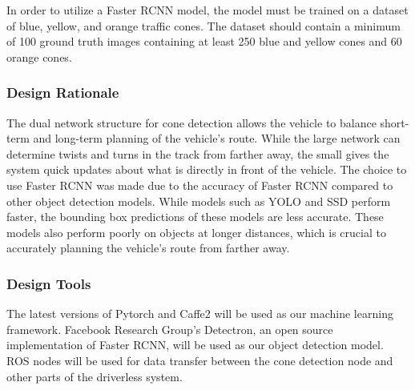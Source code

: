 \documentclass[10pt, onecolumn, draftclsnofoot, letterpaper,compsoc]{IEEEtran}
\begin{document}
In order to utilize a Faster RCNN model, the model must be trained on a dataset of blue, yellow, and orange traffic cones. The dataset should contain a minimum of 100 ground truth images containing at least 250 blue and yellow cones and 60 orange cones.



\subsubsection{Design Rationale} %
The dual network structure for cone detection allows the vehicle to balance short-term and long-term planning of the vehicle's route. While the large network can determine twists and turns in the track from farther away, the small gives the system quick updates about what is directly in front of the vehicle. The choice to use Faster RCNN was made due to the accuracy of Faster RCNN compared to other object detection models. While models such as YOLO and SSD perform faster, the bounding box predictions of these models are less accurate. These models also perform poorly on objects at longer distances, which is crucial to accurately planning the vehicle's route from farther away.

\subsubsection{Design Tools} %
The latest versions of Pytorch and Caffe2 will be used as our machine learning framework. Facebook Research Group's Detectron, an open source implementation of Faster RCNN, will be used as our object detection model. ROS nodes will be used for data transfer between the cone detection node and other parts of the driverless system. 
\end{document}
